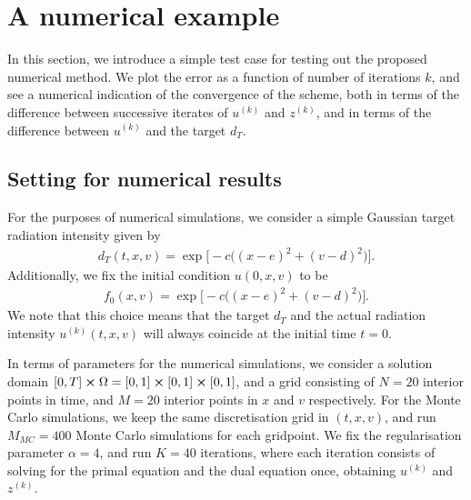 \section{A numerical example}\label{sec:numerical}

In this section, we introduce a simple test case for testing out the proposed numerical method. We plot the error as a function of number of iterations $k$, and see a numerical indication of the convergence of the scheme, both in terms of the difference between successive iterates of $u^{(k)}$ and $z^{(k)}$, and in terms of the difference between $u^{(k)}$ and the target $d_T$.

\subsection{Setting for numerical results}
For the purposes of numerical simulations, we consider a simple Gaussian target radiation intensity given by
%
\begin{align}
    d_T(t,x,v) = \exp\Big[ -c\big( {(x-e)}^2 + {(v-d)}^2 \big) \Big].
\end{align}
%
Additionally, we fix the initial condition $u(0,x,v)$ to be 
%
\begin{align}
    f_0(x,v) = \exp\Big[ -c\big( {(x-e)}^2 + {(v-d)}^2 \big) \Big].
\end{align}
%
We note that this choice means that the target $d_T$ and the actual radiation intensity $u^{(k)}(t,x,v)$ will always coincide at the initial time $t=0$. 

In terms of parameters for the numerical simulations, we consider a solution domain $[0,T]\cross \Omega = [0,1]\cross[0,1]\cross[0,1]$, and a grid consisting of $N=20$ interior points in time, and $M=20$ interior points in $x$ and $v$ respectively. For the Monte Carlo simulations, we keep the same discretisation grid in $(t,x,v)$, and run $M_{MC}=400$ Monte Carlo simulations for each gridpoint. We fix the regularisation parameter $\alpha=4$, and run $K=40$ iterations, where each iteration consists of solving for the primal equation and the dual equation once, obtaining $u^{(k)}$ and $z^{(k)}$.

